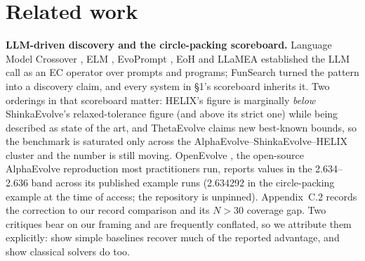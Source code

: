 \section{Related work}

\textbf{LLM-driven discovery and the circle-packing scoreboard.} Language Model Crossover
\citep{meyerson2024languagemodelcrossovervariation}, ELM \citep{lehman2022evolutionlargemodels}, EvoPrompt \citep{guo2024evoprompt}, EoH \citep{liu2024eoh} and LLaMEA \citep{vanstein2025llamealargelanguagemodel}
established the LLM call as an EC operator over prompts and programs; FunSearch turned the
pattern into a discovery claim, and every system in \S1's scoreboard inherits it. Two orderings
in that scoreboard matter: HELIX's figure is marginally \emph{below} ShinkaEvolve's
relaxed-tolerance figure (and above its strict one) while being described as state of the art, and
ThetaEvolve claims new best-known bounds, so the benchmark is saturated only across the
AlphaEvolve--ShinkaEvolve--HELIX cluster and the number is still moving. OpenEvolve \citep{sharma2025openevolve}, the
open-source AlphaEvolve reproduction most practitioners run, reports values in the 2.634--2.636
band across its published example runs (2.634292 in the circle-packing example at the time of
access; the repository is unpinned). Appendix~C.2 records the correction to our record comparison
and its $N > 30$ coverage gap. Two critiques bear on our framing and are frequently conflated, so
we attribute them explicitly: \citet{gideoni2026simplebaselinescompetitivecode} show simple
baselines recover much of the reported advantage, and
\citet{berthold2026outoftheboxglobaloptimizationpacking} show classical solvers do too.

